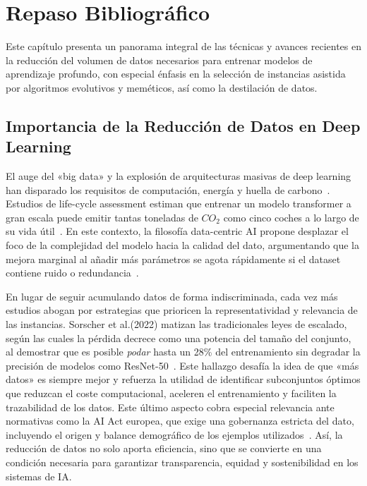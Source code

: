 
\chapter{Repaso Bibliográfico}\label{ch:repaso-bibliografico}
Este capítulo presenta un panorama integral de las técnicas y avances recientes en la reducción del volumen de datos necesarios para entrenar modelos de aprendizaje profundo,
con especial énfasis en la selección de instancias asistida por algoritmos evolutivos y meméticos, así como la destilación de datos.


\section{Importancia de la Reducción de Datos en Deep Learning}
El auge del «big data» y la explosión de arquitecturas masivas de deep learning han disparado los requisitos de computación,
energía y huella de carbono~\cite{pattersonCarbonEmissionsLarge2021}.
Estudios de life-cycle assessment estiman que entrenar un modelo transformer a gran escala puede emitir tantas toneladas de $CO_2$
como cinco coches a lo largo de su vida útil~\cite{strubellEnergyPolicyConsiderations2019}.
En este contexto, la filosofía data-centric AI propone desplazar el foco de la complejidad del modelo hacia la calidad del dato,
argumentando que la mejora marginal al añadir más parámetros se agota rápidamente si el dataset contiene ruido o redundancia~\cite{zhaDatacentricArtificialIntelligence2023}.

En lugar de seguir acumulando datos de forma indiscriminada, cada vez más estudios abogan por estrategias que prioricen la representatividad y relevancia de las instancias.
Sorscher et al.(2022) matizan las tradicionales leyes de escalado, según las cuales la pérdida decrece como una potencia del tamaño del conjunto,
al demostrar que es posible \textit{podar} hasta un 28\% del entrenamiento sin degradar la precisión de modelos como ResNet-50~\cite{sorscherNeuralScalingLaws2023}.
Este hallazgo desafía la idea de que «más datos» es siempre mejor y refuerza la utilidad de identificar subconjuntos óptimos que reduzcan el coste computacional,
aceleren el entrenamiento y faciliten la trazabilidad de los datos.
Este último aspecto cobra especial relevancia ante normativas como la AI Act europea, que exige una gobernanza estricta del dato,
incluyendo el origen y balance demográfico de los ejemplos utilizados~\cite{euAIAct2024}.
Así, la reducción de datos no solo aporta eficiencia, sino que se convierte en una condición necesaria para garantizar transparencia, equidad y sostenibilidad en los sistemas de IA.


